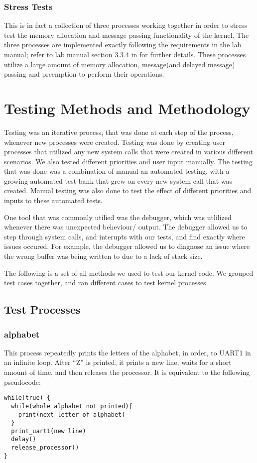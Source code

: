\documentclass[12pt]{article}
\begin{document}
\subsubsection{Stress Tests} \label{stressp}
This is in fact a collection of three processes working together in order to stress test the memory allocation and message passing functionality of the kernel. The three processes are implemented exactly following the requirements in the lab manual; refer to lab manual section 3.3.4 in  for further details. These processes utilize a large amount of memory allocation, message(and delayed message) passing and preemption to perform their operations.

\newpage
\section{Testing Methods and Methodology}\label{testing}

Testing was an iterative process, that was done at each step of the process, whenever new processes were created. Testing was done by creating user processes that utilized any new system calls that were created in various different scenarios. We also tested different priorities and user input manually. The testing that was done was a combination of manual an automated testing, with a growing automated test bank that grew on every new system call that was created. Manual testing was also done to test the effect of different priorities and inputs to these automated tests.

One tool that was commonly utilied was the debugger, which was utlilized whenever there was unexpected beheviour/ output. The debugger allowed us to step through system calls, and interupts with our tests, and find exactly where issues occured. For example, the debugger allowed us to diagnose an issue where the wrong buffer was being written to due to a lack of stack size.

The following is a set of all methods we used to test our kernel code. We grouped test cases together, and ran different cases to test kernel processes.
\subsection{Test Processes}\label{tstProcs}

\subsubsection{alphabet}\label{alphabetp}
This process repeatedly prints the letters of the alphabet, in order, to UART1 in an infinite loop. After ``Z'' is printed, it prints a new line, waits for a short amount of time, and then releases the processor. It is equivalent to the following pseudocode:
\begin{lstlisting}
while(true) {
  while(whole alphabet not printed){
    print(next letter of alphabet)
  }
  print_uart1(new line)
  delay()
  release_processor()
}
\end{lstlisting}
\end{document}
